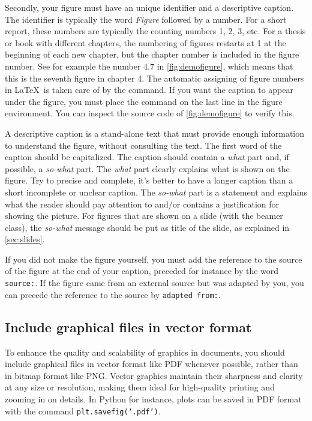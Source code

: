 Secondly, your figure must have an unique identifier and a descriptive caption. The identifier is typically the word \textit{Figure} followed by a number. For a short report, these numbers are typically the counting numbers 1, 2, 3, etc. For a thesis or book with different chapters, the numbering of figures restarts at 1 at the beginning of each new chapter, but the chapter number is included in the figure number. See for example the number 4.7 in \cref{fig:demofigure}, which means that this is the seventh figure in chapter 4. The automatic assigning of figure numbers in \LaTeX\ is taken care of by the  command. If you want the caption to appear under the figure, you must place the  command on the last line in the figure environment. You can inspect the source code of \cref{fig:demofigure} to verify this.

A descriptive caption is a stand-alone text that must provide enough information to understand the figure, without consulting the text. The first word of the caption should be capitalized. The caption should contain a \textit{what} part and, if possible, a \textit{so-what} part. The \textit{what} part clearly explains what is shown on the figure. Try to precise and complete, it's better to have a longer caption than a short incomplete or unclear caption. The \textit{so-what} part is a statement and explains what the reader should pay attention to and/or contains a justification for showing the picture. For figures that are shown on a slide (with the beamer class), the \textit{so-what} message should be put as title of the slide, as explained in \cref{sec:slides}.

If you did not make the figure yourself, you must add the reference to the source of the figure at the end of your caption, preceded for instance by the word \verb|source:|. If the figure came from an external source but was adapted by you, you can precede the reference to the source by \verb|adapted from:|.

\subsection{Include graphical files in vector format}
To enhance the quality and scalability of graphics in documents, you should include graphical files in vector format like PDF whenever possible, rather than in bitmap format like PNG. Vector graphics maintain their sharpness and clarity at any size or resolution, making them ideal for high-quality printing and zooming in on details. In Python for instance, plots can be saved in PDF format with the command \texttt{plt.savefig(`.pdf')}.

